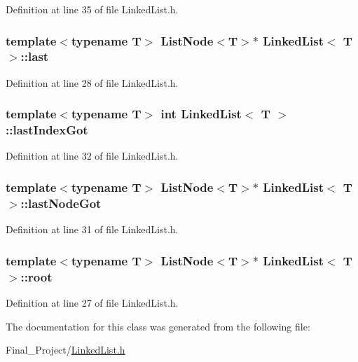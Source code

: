 Definition at line 35 of file Linked\-List.\-h.

\hypertarget{classLinkedList_ae21ffbddc0bed9b6bd7799dba7c7e6c9}{
\subsubsection[{last}]{\setlength{\rightskip}{0pt plus 5cm}template$<$typename T$>$ {\bf List\-Node}$<$T$>$$\ast$ {\bf Linked\-List}$<$ T $>$\-::last\hspace{0.3cm}{\ttfamily [protected]}}}\label{classLinkedList_ae21ffbddc0bed9b6bd7799dba7c7e6c9}


Definition at line 28 of file Linked\-List.\-h.

\hypertarget{classLinkedList_a29bcd5966f3e88990007d76c122e22e3}{
\subsubsection[{last\-Index\-Got}]{\setlength{\rightskip}{0pt plus 5cm}template$<$typename T$>$ int {\bf Linked\-List}$<$ T $>$\-::last\-Index\-Got\hspace{0.3cm}{\ttfamily [protected]}}}\label{classLinkedList_a29bcd5966f3e88990007d76c122e22e3}


Definition at line 32 of file Linked\-List.\-h.

\hypertarget{classLinkedList_aff769fff999bc5524dac82fa328f2bd8}{
\subsubsection[{last\-Node\-Got}]{\setlength{\rightskip}{0pt plus 5cm}template$<$typename T$>$ {\bf List\-Node}$<$T$>$$\ast$ {\bf Linked\-List}$<$ T $>$\-::last\-Node\-Got\hspace{0.3cm}{\ttfamily [protected]}}}\label{classLinkedList_aff769fff999bc5524dac82fa328f2bd8}


Definition at line 31 of file Linked\-List.\-h.

\hypertarget{classLinkedList_ae5e0a92c9b9b936a49a4e40a121a2b31}{
\subsubsection[{root}]{\setlength{\rightskip}{0pt plus 5cm}template$<$typename T$>$ {\bf List\-Node}$<$T$>$$\ast$ {\bf Linked\-List}$<$ T $>$\-::root\hspace{0.3cm}{\ttfamily [protected]}}}\label{classLinkedList_ae5e0a92c9b9b936a49a4e40a121a2b31}


Definition at line 27 of file Linked\-List.\-h.



The documentation for this class was generated from the following file\-:\begin{DoxyCompactItemize}
\item 
Final\-\_\-\-Project/\hyperlink{LinkedList_8h}{Linked\-List.\-h}\end{DoxyCompactItemize}
